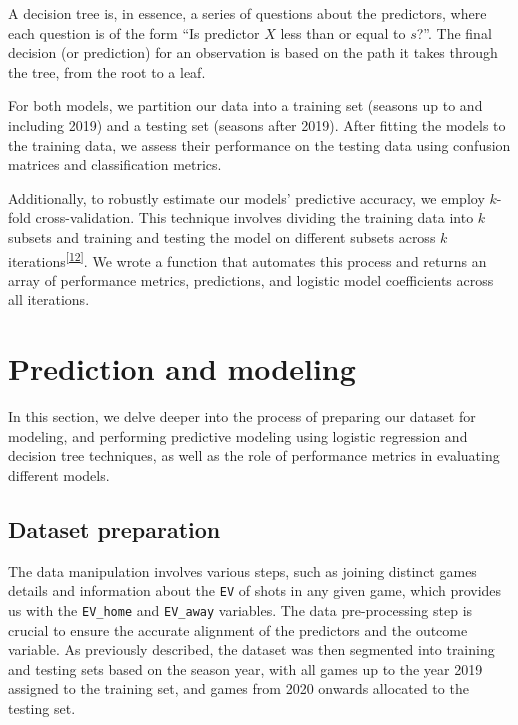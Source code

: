 \documentclass[
  12pt,
  a4paper,
]{article}
\begin{document}
A decision tree is, in essence, a series of questions about the predictors, where each question is of the form ``Is predictor \(X\) less than or equal to \(s\)?''. The final decision (or prediction) for an observation is based on the path it takes through the tree, from the root to a leaf.

For both models, we partition our data into a training set (seasons up to and including 2019) and a testing set (seasons after 2019). After fitting the models to the training data, we assess their performance on the testing data using confusion matrices and classification metrics.

Additionally, to robustly estimate our models' predictive accuracy, we employ \(k\)-fold cross-validation. This technique involves dividing the training data into \(k\) subsets and training and testing the model on different subsets across \(k\) iterations\textsuperscript{{[}\protect\hyperlink{ref-kFold}{12}{]}}. We wrote a function that automates this process and returns an array of performance metrics, predictions, and logistic model coefficients across all iterations.

\hypertarget{prediction-and-modeling}{%
\section{Prediction and modeling}\label{prediction-and-modeling}}

In this section, we delve deeper into the process of preparing our dataset for modeling, and performing predictive modeling using logistic regression and decision tree techniques, as well as the role of performance metrics in evaluating different models.

\hypertarget{dataset-preparation}{%
\subsection{Dataset preparation}\label{dataset-preparation}}

The data manipulation involves various steps, such as joining distinct games details and information about the \texttt{EV} of shots in any given game, which provides us with the \texttt{EV\_home} and \texttt{EV\_away} variables. The data pre-processing step is crucial to ensure the accurate alignment of the predictors and the outcome variable. As previously described, the dataset was then segmented into training and testing sets based on the season year, with all games up to the year 2019 assigned to the training set, and games from 2020 onwards allocated to the testing set.
\end{document}
